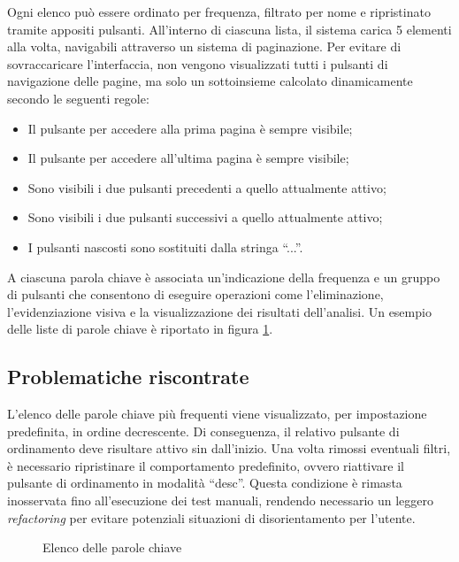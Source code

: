 \vspace{5pt}
\par\noindent Ogni elenco può essere ordinato per frequenza, filtrato per nome e ripristinato tramite appositi pulsanti. All’interno di ciascuna lista, il sistema carica 5 elementi alla volta, navigabili attraverso un sistema di paginazione. Per evitare di sovraccaricare l’interfaccia, non vengono visualizzati tutti i pulsanti di navigazione delle pagine, ma solo un sottoinsieme calcolato dinamicamente secondo le seguenti regole:
\begin{itemize}
  \item Il pulsante per accedere alla prima pagina è sempre visibile;
  \item Il pulsante per accedere all’ultima pagina è sempre visibile;
  \item Sono visibili i due pulsanti precedenti a quello attualmente attivo;
  \item Sono visibili i due pulsanti successivi a quello attualmente attivo;
  \item I pulsanti nascosti sono sostituiti dalla stringa “...”.
\end{itemize}

\vspace{5pt}
\par\noindent A ciascuna parola chiave è associata un’indicazione della frequenza e un gruppo di pulsanti che consentono di eseguire operazioni come l’eliminazione, l’evidenziazione visiva e la visualizzazione dei risultati dell’analisi. Un esempio delle liste di parole chiave è riportato in figura \ref{fig:keyword_list}.

\subsection{Problematiche riscontrate}

\par L’elenco delle parole chiave più frequenti viene visualizzato, per impostazione predefinita, in ordine decrescente. Di conseguenza, il relativo pulsante di ordinamento deve risultare attivo sin dall’inizio. Una volta rimossi eventuali filtri, è necessario ripristinare il comportamento predefinito, ovvero riattivare il pulsante di ordinamento in modalità “desc”. Questa condizione è rimasta inosservata fino all’esecuzione dei test manuali, rendendo necessario un leggero \textit{refactoring} per evitare potenziali situazioni di disorientamento per l’utente.

\begin{figure}[H]
  \centering 
  \caption{Elenco delle parole chiave}
  \label{fig:keyword_list}
\end{figure}